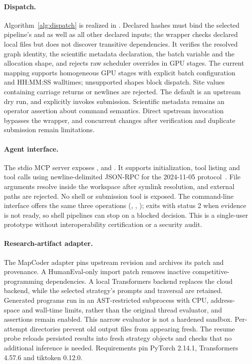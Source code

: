 \paragraph{Dispatch.} Algorithm~\ref{alg:dispatch} is realized in . Declared hashes must bind the selected pipeline's  and  as well as all other declared inputs; the wrapper checks declared local files but does not discover transitive dependencies. It verifies the resolved graph identity, the scientific metadata declaration, the batch variable and the allocation shape, and rejects raw scheduler overrides in GPU stages. The current mapping supports homogeneous GPU stages with explicit batch configuration and HH:MM:SS walltimes; unsupported shapes block dispatch. Site values containing carriage returns or newlines are rejected. The default is an upstream dry run, and  explicitly invokes submission. Scientific metadata remains an operator assertion about command semantics. Direct upstream invocation bypasses the wrapper, and concurrent changes after verification and duplicate submission remain limitations.

\paragraph{Agent interface.} The stdio MCP server exposes ,  and . It supports initialization, tool listing and tool calls using newline-delimited JSON-RPC for the 2024-11-05 protocol~\cite{mcp2024transport}. File arguments resolve inside the workspace after symlink resolution, and external paths are rejected. No shell or submission tool is exposed. The command-line interface offers the same three operations (, , );  exits with status 2 when evidence is not ready, so shell pipelines can stop on a blocked decision. This is a single-user prototype without interoperability certification or a security audit.

\paragraph{Research-artifact adapter.} The MapCoder adapter pins upstream revision  and archives its patch and provenance. A HumanEval-only import patch removes inactive competitive-programming dependencies. A local Transformers backend replaces the cloud backend, while the selected strategy's prompts and traversal are retained. Generated programs run in an AST-restricted subprocess with CPU, address-space and wall-time limits, rather than the original thread evaluator, and assertions remain enabled. This narrow evaluator is not a hardened sandbox. Per-attempt directories prevent old output files from appearing fresh. The resume probe reloads persisted results into fresh strategy objects and checks that no additional inference is needed. Requirements pin PyTorch 2.14.1, Transformers 4.57.6 and tiktoken 0.12.0.

